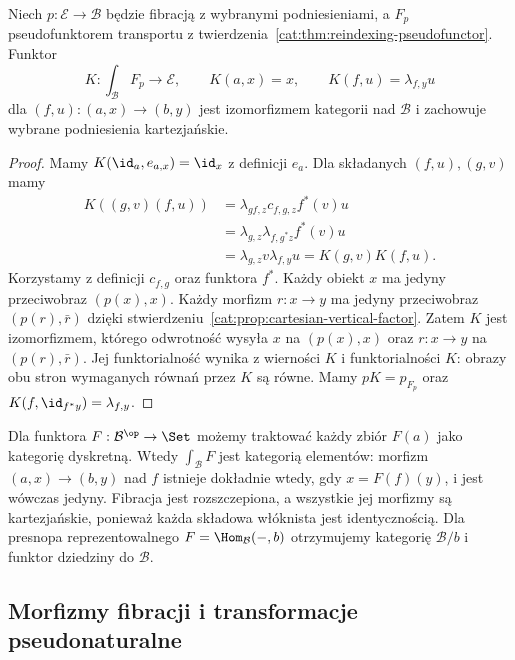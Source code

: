 \begin{twierdzenie}\label{cat:thm:grothendieck-reconstruct}
Niech $p:\mathcal E\to\mathcal B$ będzie fibracją z wybranymi podniesieniami, a $F_p$ pseudofunktorem transportu z twierdzenia~\ref{cat:thm:reindexing-pseudofunctor}. Funktor
\[
 K:\int_{\mathcal B}F_p\longrightarrow\mathcal E,\qquad
 K(a,x)=x,\qquad K(f,u)=\lambda_{f,y}u
\]
dla $(f,u):(a,x)\to(b,y)$ jest izomorfizmem kategorii nad $\mathcal B$ i zachowuje wybrane podniesienia kartezjańskie.
\end{twierdzenie}
\begin{proof}
Mamy $K(\id_a,e_{a,x})=\id_x$ z definicji $e_a$. Dla składanych $(f,u),(g,v)$ mamy
\[
\begin{aligned}
 K((g,v)(f,u))
 &=\lambda_{gf,z}c_{f,g,z}f^*(v)u\\
 &=\lambda_{g,z}\lambda_{f,g^*z}f^*(v)u\\
 &=\lambda_{g,z}v\lambda_{f,y}u
 =K(g,v)K(f,u).
\end{aligned}
\]
Korzystamy z definicji $c_{f,g}$ oraz funktora $f^*$. Każdy obiekt $x$ ma jedyny przeciwobraz $(p(x),x)$. Każdy morfizm $r:x\to y$ ma jedyny przeciwobraz $(p(r),\bar r)$ dzięki stwierdzeniu~\ref{cat:prop:cartesian-vertical-factor}. Zatem $K$ jest izomorfizmem, którego odwrotność wysyła $x$ na $(p(x),x)$ oraz $r:x\to y$ na $(p(r),\bar r)$. Jej funktorialność wynika z wierności $K$ i funktorialności $K$: obrazy obu stron wymaganych równań przez $K$ są równe. Mamy $pK=p_{F_p}$ oraz $K(f,\id_{f^*y})=\lambda_{f,y}$.
\end{proof}

\begin{przyklad}\label{cat:ex:presheaf-elements-fibration}
Dla funktora $F:\mathcal B^{\op}\to\Set$ możemy traktować każdy zbiór $F(a)$ jako kategorię dyskretną. Wtedy $\int_{\mathcal B}F$ jest kategorią elementów: morfizm $(a,x)\to(b,y)$ nad $f$ istnieje dokładnie wtedy, gdy $x=F(f)(y)$, i jest wówczas jedyny. Fibracja jest rozszczepiona, a wszystkie jej morfizmy są kartezjańskie, ponieważ każda składowa włóknista jest identycznością. Dla presnopa reprezentowalnego $F=\Hom_{\mathcal B}(-,b)$ otrzymujemy kategorię $\mathcal B/b$ i funktor dziedziny do $\mathcal B$.
\end{przyklad}

\subsection{Morfizmy fibracji i transformacje pseudonaturalne}

